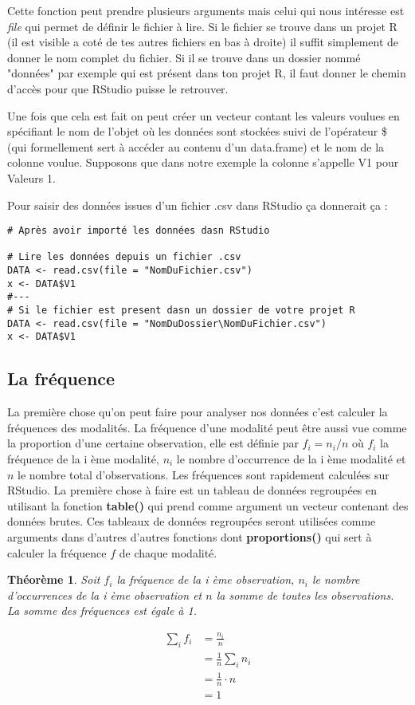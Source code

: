 \documentclass{report}
\newtheorem{theorem}{Théorème}
\begin{document}
Cette fonction peut prendre plusieurs arguments mais celui qui nous intéresse est \textit{file} qui permet de définir le fichier à lire. Si le fichier se trouve dans un projet R (il est visible a coté de tes autres fichiers en bas à droite) il suffit simplement de donner le nom complet du fichier. Si il se trouve dans un dossier nommé "données" par exemple qui est présent dans ton projet R, il faut donner le chemin d'accès pour que RStudio puisse le retrouver.

Une fois que cela est fait on peut créer un vecteur contant les valeurs voulues en spécifiant le nom de l'objet où les données sont stockées suivi de l'opérateur \$ (qui formellement sert à accéder au contenu d'un data.frame) et le nom de la colonne voulue. Supposons que dans notre exemple la colonne s'appelle V1 pour Valeurs 1.

Pour saisir des données issues d'un fichier .csv dans RStudio ça donnerait ça :

\begin{verbatim}
# Après avoir importé les données dasn RStudio

# Lire les données depuis un fichier .csv
DATA <- read.csv(file = "NomDuFichier.csv")
x <- DATA$V1
#---
# Si le fichier est present dasn un dossier de votre projet R
DATA <- read.csv(file = "NomDuDossier\NomDuFichier.csv")
x <- DATA$V1
\end{verbatim}

\newpage

\subsection{La fréquence}

La première chose qu'on peut faire pour analyser nos données c'est calculer la fréquences des modalités. La fréquence d'une modalité peut être aussi vue comme la proportion d'une certaine observation, elle est définie par $f_i = n_i/n$ où $f_i$ la fréquence de la i ème modalité, $n_i$ le nombre d'occurrence de la i ème modalité et $n$ le nombre total d'observations. Les fréquences sont rapidement calculées sur RStudio. La première chose à faire est un tableau de données regroupées en utilisant la fonction \textbf{table()} qui prend comme argument un vecteur contenant des données brutes. Ces tableaux de données regroupées seront utilisées comme arguments dans d'autres d'autres fonctions dont \textbf{proportions()} qui sert à calculer la fréquence $f$ de chaque modalité. 

\begin{theorem}
Soit $f_i$ la fréquence de la i ème observation, $n_i$ le nombre d'occurrences de la i ème observation et $n$ la somme de toutes les observations. La somme des fréquences est égale à 1.

\begin{align*}
  \sum_{i} f_i &= \frac{n_i}{n} \\
 &=  \frac{1}{n}  \sum_{i} n_i \\
 &= \frac{1}{n} \cdot n \\
 &= 1
\end{align*}
\end{theorem}
\end{document}
